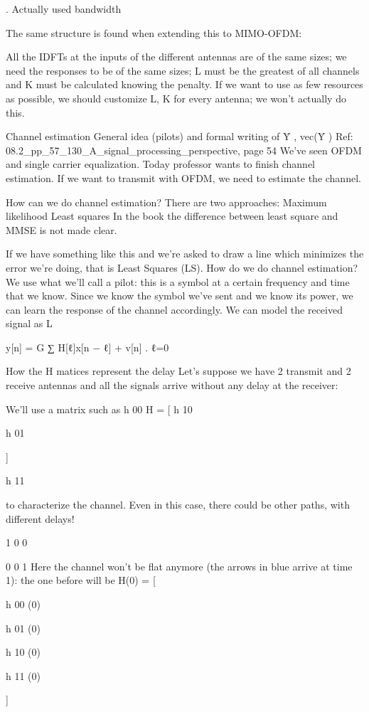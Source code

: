 {{{.
Actually used bandwidth

The same structure is found when extending this to MIMO-OFDM:

All the IDFTs at the inputs of the different antennas are of the same sizes; we need the responses to be of the same sizes; L must be the greatest of all channels and K must be calculated knowing the penalty.
If we want to use as few resources as possible, we should customize L, K for every antenna; we won't actually do this.

Channel estimation General idea (pilots) and formal writing of Ȳ , vec(Ȳ )
Ref: 08.2_pp_57_130_A_signal_processing_perspective, page 54 We've seen OFDM and single carrier equalization.
Today professor wants to finish channel estimation. If we want to transmit with OFDM, we need to estimate the channel.

How can we do channel estimation? There are two approaches:
Maximum likelihood Least squares In the book the difference between least square and MMSE is not made clear.

If we have something like this and we're asked to draw a line which minimizes the error we're doing, that is Least Squares (LS).
How do we do channel estimation? We use what we'll call a pilot: this is a symbol at a certain frequency and time that we know.
Since we know the symbol we've sent and we know its power, we can learn the response of the channel accordingly.
We can model the received signal as L

y[n] = \sqrt G ∑ H[ℓ]x[n − ℓ] + v[n] .
ℓ=0

How the H matices represent the delay Let's suppose we have 2 transmit and 2 receive antennas and all the signals arrive without any delay at the receiver:

We'll use a matrix such as h 00 H = [
h 10

h 01

]

h 11

to characterize the channel.
Even in this case, there could be other paths, with different delays!

1 0 0

0 0 1 Here the channel won't be flat anymore (the arrows in blue arrive at time 1): the one before will be H(0) = [

h 00 (0)

h 01 (0)

h 10 (0)

h 11 (0)

]

}}}
